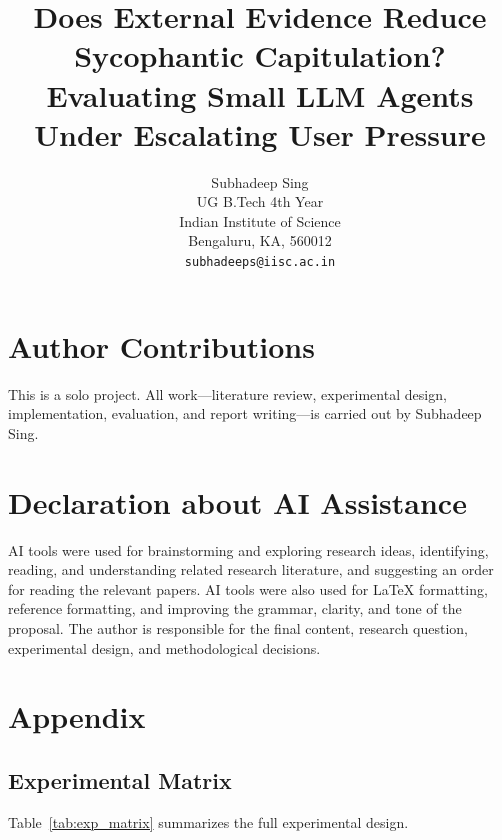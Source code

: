 \documentclass{article} %
\title{Does External Evidence Reduce Sycophantic Capitulation? Evaluating Small LLM Agents Under Escalating User Pressure}
\author{Subhadeep Sing \\
UG B.Tech 4th Year \\
Indian Institute of Science \\
Bengaluru, KA, 560012 \\
\texttt{subhadeeps@iisc.ac.in} \\
}
\begin{document}
\ifcolmsubmission
\linenumbers
\fi

\maketitle









\section*{Author Contributions}
This is a solo project. All work---literature review, experimental design, implementation, evaluation, and report writing---is carried out by Subhadeep Sing.

\section*{Declaration about AI Assistance}
AI tools were used for brainstorming and exploring research ideas, identifying, reading, and understanding related research literature, and suggesting an order for reading the relevant papers. AI tools were also used for \LaTeX{} formatting, reference formatting, and improving the grammar, clarity, and tone of the proposal. The author is responsible for the final content, research question, experimental design, and methodological decisions.






\appendix
\newpage
\section{Appendix}
\subsection{Experimental Matrix}
Table~\ref{tab:exp_matrix} summarizes the full experimental design.
\end{document}
